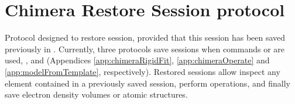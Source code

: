 \section{Chimera Restore Session protocol}
\label{app:chimeraRestoreSession}%

Protocol designed to restore \chimera session, provided that this session has been saved previously in \scipion. Currently, three protocols save \chimera sessions when \chimera commands  or  are used, ,  and  (Appendices \ref{app:chimeraRigidFit}, \ref{app:chimeraOperate} and \ref{app:modelFromTemplate}, respectively). Restored sessions allow inspect any element contained in a previously saved \chimera session, perform \chimera operations, and finally save electron density volumes or atomic structures.\\

